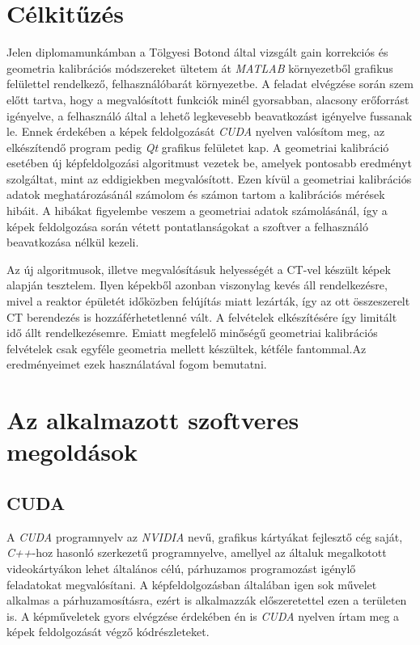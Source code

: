 \documentclass[a4paper,12pt]{article}
\begin{document}
\section{Célkitűzés}


Jelen diplomamunkámban a Tölgyesi Botond által vizsgált gain korrekciós és geometria kalibrációs módszereket ültetem át \emph{MATLAB} környezetből grafikus felülettel rendelkező, felhasználóbarát környezetbe. A feladat elvégzése során szem előtt tartva, hogy a megvalósított funkciók minél gyorsabban, alacsony erőforrást igényelve, a felhasználó által a lehető legkevesebb beavatkozást igényelve fussanak le. Ennek érdekében a képek feldolgozását \emph{CUDA} nyelven valósítom meg, az elkészítendő program pedig \emph{Qt} grafikus felületet kap. A geometriai kalibráció esetében új képfeldolgozási algoritmust vezetek be, amelyek pontosabb eredményt szolgáltat, mint az eddigiekben megvalósított. Ezen kívül a geometriai kalibrációs adatok meghatározásánál számolom és számon tartom a kalibrációs mérések hibáit. A hibákat figyelembe veszem a geometriai adatok számolásánál, így a képek feldolgozása során vétett pontatlanságokat a szoftver a felhasználó beavatkozása nélkül kezeli.


Az új algoritmusok, illetve megvalósításuk helyességét a CT-vel készült képek alapján tesztelem. Ilyen képekből azonban  viszonylag kevés áll rendelkezésre, mivel  a reaktor épületét időközben felújítás miatt lezárták, így az ott összeszerelt CT berendezés is hozzáférhetetlenné vált. A felvételek elkészítésére így limitált idő állt rendelkezésemre. Emiatt megfelelő minőségű geometriai kalibrációs felvételek csak egyféle geometria mellett készültek, kétféle fantommal.Az eredményeimet ezek használatával fogom bemutatni.





\section{Az alkalmazott szoftveres megoldások}

\subsection{CUDA}
\label{sec:cuda}


A \emph{CUDA} \cite{cuda} programnyelv az \emph{NVIDIA} nevű, grafikus kártyákat fejlesztő cég saját, \emph{C++}-hoz hasonló szerkezetű programnyelve, amellyel az általuk megalkotott videokártyákon lehet általános célú, párhuzamos programozást igénylő feladatokat megvalósítani. A képfeldolgozásban általában igen sok művelet alkalmas a párhuzamosításra, ezért is alkalmazzák előszeretettel ezen a területen is. A képműveletek gyors elvégzése érdekében én is \emph{CUDA} nyelven írtam meg a képek feldolgozását végző kódrészleteket. 
\end{document}
